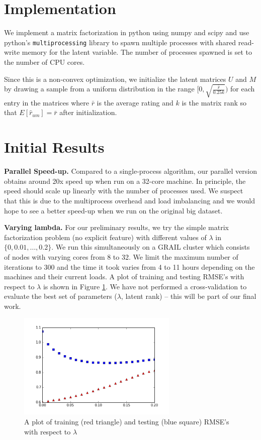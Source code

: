 \documentclass{article} %
\begin{document}
\section{Implementation}

We implement a matrix factorization in python using numpy and scipy and use python's \texttt{multiprocessing} library to spawn multiple processes with shared read-write memory for the latent variable. The number of processes spawned is set to the number of CPU cores.

Since this is a non-convex optimization, we initialize the latent matrices $U$ and $M$ by drawing a sample from a uniform distribution in the range $[0,\sqrt{\frac{\bar{r}}{0.25k}})$ for each entry in the matrices where $\bar{r}$ is the average rating and $k$ is the matrix rank so that $E[\hat{r}_{um}] = \bar{r}$ after initialization.

\section{Initial Results}

\textbf{Parallel Speed-up.}  Compared to a single-process algorithm, our
parallel version obtains around 20x speed up when run on a 32-core machine. In
principle, the speed should scale up linearly with the number of processes
used. We suspect that this is due to the multiprocess overhead and load
imbalancing and we would hope to see a better speed-up when we run on the
original big dataset.

\textbf{Varying lambda.}  For our preliminary results, we try the simple
matrix factorization problem (no explicit feature) with different
values of $\lambda$ in $\{0, 0.01, \ldots, 0.2\}$. We run this simultaneously
on a GRAIL cluster which consists of nodes with varying cores from 8 to 32. We
limit the maximum number of iterations to 300 and the time it took varies from
4 to 11 hours depending on the machines and their current loads. A plot of
training and testing RMSE's with respect to $\lambda$ is shown in Figure
\ref{fig:rmselambda}. We have not performed a cross-validation to evaluate the
best set of parameters ($\lambda$, latent rank) -- this will be part of our
final work.


\begin{figure}[h]
\centering
\includegraphics[width=3in]{../plot.png}
\caption{\label{fig:rmselambda} A plot of
training (red triangle) and testing (blue square) RMSE's with respect to $\lambda$ }
\end{figure}
\end{document}
